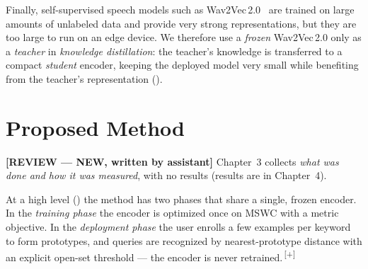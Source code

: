 \documentclass[12pt,a4paper]{report}
\newcommand{\NEW}[1]{{\color{addcolor}#1\,\textsuperscript{\tiny[+]}}}
\newcommand{\reviewnote}[1]{%
    \par\smallskip\noindent
    \colorbox{yellow!35}{\parbox{0.97\linewidth}{\small\textbf{[REVIEW — NEW, written by assistant]}\; #1}}%
    \par\smallskip}
\newcommand{\NEW}[1]{#1}
\newcommand{\reviewnote}[1]{}
\begin{document}
Finally, self-supervised speech models such as
Wav2Vec\,2.0~\cite{baevski2020wav2vec} are trained on large amounts of unlabeled
data and provide very strong representations, but they are too large to run on an
edge device. We therefore use a \emph{frozen} Wav2Vec\,2.0 only as a
\emph{teacher} in \emph{knowledge distillation}: the teacher's knowledge is
transferred to a compact \emph{student} encoder, keeping the deployed model very
small while benefiting from the teacher's representation ().

\chapter{Proposed Method}\label{ch:method}
\reviewnote{Chapter~3 collects \emph{what was done and how it was measured}, with
no results (results are in Chapter~4).}

\NEW{At a high level () the method has two phases that share a
single, frozen encoder. In the \emph{training phase} the encoder is optimized
once on MSWC with a metric objective. In the \emph{deployment phase} the user
enrolls a few examples per keyword to form prototypes, and queries are recognized
by nearest-prototype distance with an explicit open-set threshold --- the encoder
is never retrained.}
\end{document}
